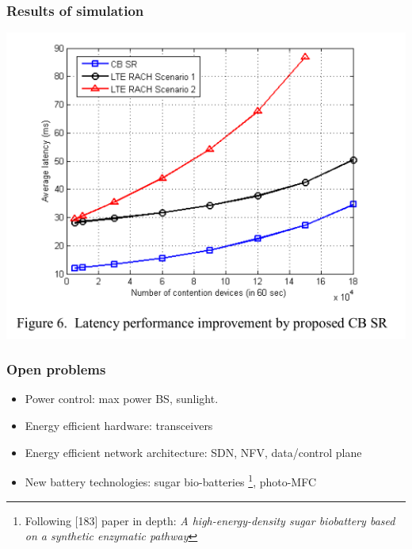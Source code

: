 \documentclass[a4paper,11pt,handout]{beamer}
\begin{document}
\begin{frame}
	\frametitle{Results of simulation}

	\begin{center}
	\includegraphics[scale=0.4]{cb-latency.png}
	\end{center}

\end{frame}
\note{}
\begin{frame}
\frametitle{Open problems}

\begin{itemize}
\item Power control: max power BS, sunlight.
\item Energy efficient hardware: transceivers
\item Energy efficient network architecture: SDN, NFV, data/control plane
\item New battery technologies: sugar bio-batteries%
\footnote{Following [183] paper in depth: \textsl{A high-energy-density sugar 
biobattery based on a synthetic enzymatic pathway}}, photo-MFC
\end{itemize}

\end{frame}
\end{document}
